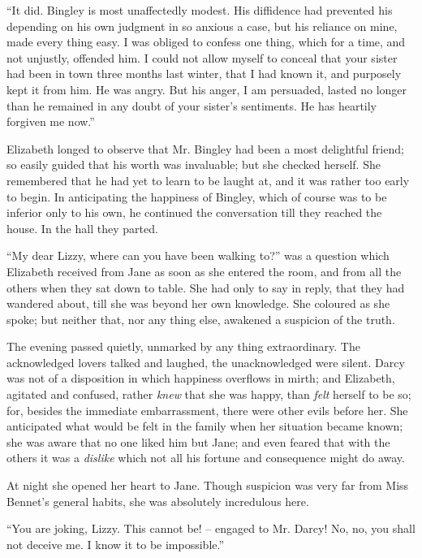 “It did. Bingley is most unaffectedly modest. His
diffidence had prevented his depending on his own judgment
in so anxious a case, but his reliance on mine, made
every thing easy. I was obliged to confess one thing,
which for a time, and not unjustly, offended him. I could
not allow myself to conceal that your sister had been in
town three months last winter, that I had known it, and
purposely kept it from him. He was angry. But his
anger, I am persuaded, lasted no longer than he remained
in any doubt of your sister’s sentiments. He has heartily
forgiven me now.”

Elizabeth longed to observe that Mr. Bingley had been
a most delightful friend; so easily guided that his worth
was invaluable; but she checked herself. She remembered
that he had yet to learn to be laught at, and it
was rather too early to begin. In anticipating the happiness
of Bingley, which of course was to be inferior only
to his own, he continued the conversation till they reached
the house. In the hall they parted.


“My dear Lizzy, where can you have been walking
to?” was a question which Elizabeth received from Jane
as soon as she entered the room, and from all the others
when they sat down to table. She had only to say in
reply, that they had wandered about, till she was beyond
her own knowledge. She coloured as she spoke; but
neither that, nor any thing else, awakened a suspicion of
the truth.

The evening passed quietly, unmarked by any thing
extraordinary. The acknowledged lovers tal\-ked and
laughed, the unacknowledged were silent. Darcy was not
of a disposition in which happiness overflows in mirth;
and Elizabeth, agitated and confused, rather \textit{knew} that
she was happy, than \textit{felt} herself to be so; for, besides the
immediate embarrassment, there were other evils before
her. She anticipated what would be felt in the family when
her situation became known; she was aware that no one
liked him but Jane; and even feared that with the others
it was a \textit{dislike} which not all his fortune and consequence
might do away.

At night she opened her heart to Jane. Though suspicion
was very far from Miss Bennet’s general habits, she
was absolutely incredulous here.

“You are joking, Lizzy. This cannot be! -- engaged to
Mr. Darcy! No, no, you shall not deceive me. I know
it to be impossible.”

